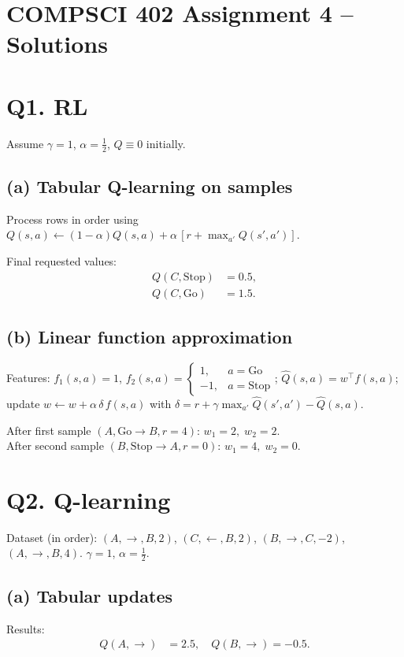 \documentclass[11pt]{article}
\begin{document}
\section*{COMPSCI 402 Assignment 4 -- Solutions}

\section{Q1. RL}
Assume $\gamma=1$, $\alpha=\tfrac{1}{2}$, $Q\equiv0$ initially.

\subsection{(a) Tabular Q-learning on samples}
Process rows in order using $Q(s,a)\leftarrow (1-\alpha)Q(s,a)+\alpha\,[r+\max_{a'}Q(s',a')]$.

\noindent Final requested values:
\begin{align*}
Q(C,\text{Stop})&=\boxed{0.5},\\
Q(C,\text{Go})&=\boxed{1.5}.
\end{align*}

\subsection{(b) Linear function approximation}
Features: $f_1(s,a)=1$, $f_2(s,a)=\begin{cases}1,&a=\text{Go}\\-1,&a=\text{Stop}\end{cases}$; $\hat Q(s,a)=w^\top f(s,a)$; update $w\leftarrow w+\alpha\,\delta\,f(s,a)$ with $\delta=r+\gamma\max_{a'}\hat Q(s',a')-\hat Q(s,a)$.

After first sample $(A,\text{Go}\to B, r=4)$: $\boxed{w_1=2,\;w_2=2}$.\\
After second sample $(B,\text{Stop}\to A, r=0)$: $\boxed{w_1=4,\;w_2=0}$.

\section{Q2. Q-learning}
Dataset (in order): $(A,\rightarrow,B,2)$, $(C,\leftarrow,B,2)$, $(B,\rightarrow,C,-2)$, $(A,\rightarrow,B,4)$. $\gamma=1$, $\alpha=\tfrac{1}{2}$.

\subsection{(a) Tabular updates}
\noindent Results:
\begin{align*}
Q(A,\rightarrow)&=\boxed{2.5},\quad Q(B,\rightarrow)=\boxed{-0.5}.
\end{align*}
\end{document}

